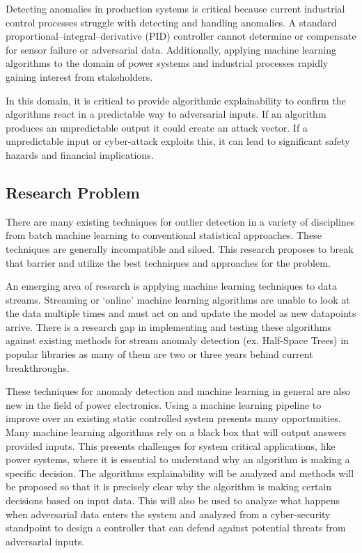 Detecting anomalies in production systems is critical because current industrial control processes struggle with detecting and handling anomalies. A standard proportional–integral–derivative (PID) controller cannot determine or compensate for sensor failure or adversarial data. Additionally, applying machine learning algorithms to the domain of power systems and industrial processes rapidly gaining interest from stakeholders.

In this domain, it is critical to provide algorithmic explainability to confirm the algorithms react in a predictable way to adversarial inputs. If an algorithm produces an unpredictable output it could create an attack vector. If a unpredictable input or cyber-attack exploits this, it can lead to significant safety hazards and financial implications.

\subsection{Research Problem}

There are many existing techniques for outlier detection in a variety of disciplines from batch machine learning to conventional statistical approaches. These techniques are generally incompatible and siloed. This research proposes to break that barrier and utilize the best techniques and approaches for the problem.

An emerging area of research is applying machine learning techniques to data streams. Streaming or `online' machine learning algorithms are unable to look at the data multiple times and must act on and update the model as new datapoints arrive. There is a research gap in implementing and testing these algorithms against existing methods for stream anomaly detection (ex. Half-Space Trees) in popular libraries as many of them are two or three years behind current breakthroughs.

These techniques for anomaly detection and machine learning in general are also new in the field of power electronics. Using a machine learning pipeline to improve over an existing static controlled system presents many opportunities. Many machine learning algorithms rely on a black box that will output answers provided inputs. This presents challenges for system critical applications, like power systems, where it is essential to understand why an algorithm is making a specific decision. The algorithms explainability will be analyzed and methods will be proposed so that it is precisely clear why the algorithm is making certain decisions based on input data. This will also be used to analyze what happens when adversarial data enters the system and analyzed from a cyber-security standpoint to design a controller that can defend against potential threats from adversarial inputs.

